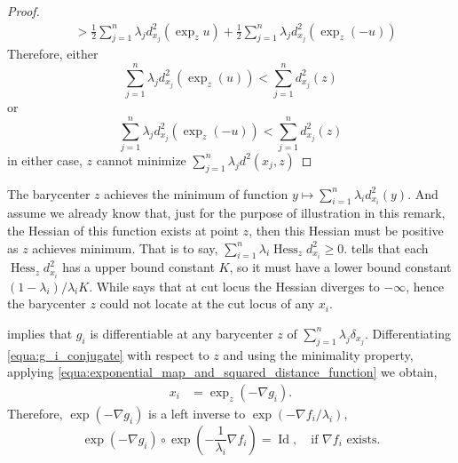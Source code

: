 \begin{proof}
\begin{align*}
											  & > \frac { 1 } { 2 } \sum _ { j = 1 } ^ { n } \lambda_j d ^ { 2 } _{ x _ { j } } \left( \exp _ { z } u \right)
											  + \frac { 1 } { 2 } \sum _ { j = 1 } ^ { n } \lambda_j d ^ { 2 }_{ x _ { j }} \left( \exp _ { z } ( - u ) \right)
	\end{align*}
	Therefore, either
	\[ \sum _ { j = 1 } ^ { n } \lambda_j d ^ { 2 } _{ x _ { j } }\left( \exp _ { z } (u) \right)
	< \sum _ { j = 1 } ^ { n } d ^ { 2 } _{ x _ { j }} \left( z \right) \]
	or
	\[ \sum _ { j = 1 } ^ { n } \lambda_j d ^ { 2 } _{ x _ { j } }\left( \exp _ { z } (-u) \right)
	< \sum _ { j = 1 } ^ { n } d ^ { 2 } _{ x _ { j }} \left( z \right) \]
	in either case, \( z \) cannot minimize \( \sum _ { j = 1 } ^ { n } \lambda_j d ^ { 2 } \left( x _ { j } , z \right) \)
\end{proof}

\begin{rmk}
The barycenter $z$ achieves the minimum of function $y \mapsto \sum_{i=1}^n \lambda_i d^2_{x_i}(y)$.
And assume we already know that, just for the purpose of illustration in this remark,
the Hessian of this function exists at point $z$,
then this Hessian must be positive as $z$ achieves minimum.
That is to say, $\sum_{i=1}^n \lambda_i \operatorname{Hess}_z d^2_{x_i} \geq 0$.
 tells that each $\operatorname{Hess}_z d^2_{x_i}$
has a upper bound constant $K$, so it must have a lower bound constant $(1-\lambda_i)/\lambda_i K$.
While  says that at cut locus
the Hessian diverges to $-\infty$,
hence the barycenter $z$ could not locate at the cut locus of any $x_i$.
\end{rmk}

 implies that $g_i$ is differentiable at
any barycenter $z$ of $\sum_{j=1}^n \lambda_j \delta_{x_j}$.
Differentiating \cref{equa:g_i_conjugate} with respect to %
$z$ and using the minimality property,
applying \cref{equa:exponential_map_and_squared_distance_function} we obtain,
\begin{align*}
	x_i & = \exp_{z}( - \nabla g_i).
\end{align*}
Therefore, $ \exp(- \nabla g_i) $ is a left inverse to $\exp( - \nabla f_i / \lambda_i)$,
\begin{equation}
	\label{equa:left_inverse_barycenter_map}
	\exp( - \nabla g_i) \circ \exp( - \frac{1}{\lambda_i} \nabla f_i) = \operatorname{Id},
	\quad \text{if } \nabla f_i \text{ exists}.
\end{equation}

